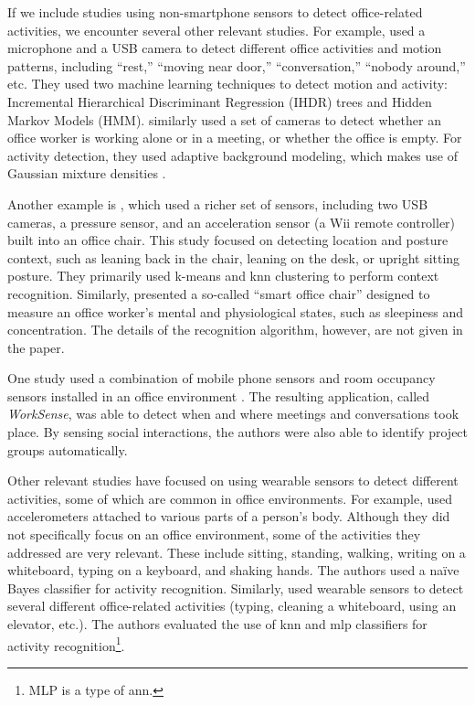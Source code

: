 If we include studies using non-smartphone sensors to detect office-related activities, we encounter several other relevant studies. For example, \cite{huang2004office} %
used a microphone and a USB %
camera to detect different office activities and motion patterns, including ``rest,'' ``moving near door,'' ``conversation,'' ``nobody around,'' etc. They used two machine learning techniques to detect motion and activity: Incremental Hierarchical Discriminant Regression (IHDR) trees and Hidden Markov Models (HMM). \cite{danninger2008context} similarly used a set of cameras to detect whether an office worker is working alone or in a meeting, or whether the office is empty. For activity detection, they used adaptive background modeling, which makes use of Gaussian mixture densities \cite{stauffer1999adaptive}.

Another example is \cite{manabe2010perceptual}, which used a richer set of sensors, including two USB cameras, a pressure sensor, and an acceleration sensor (a Wii remote controller) built into an office chair. This study focused on detecting location and posture context, such as leaning back in the chair, leaning on the desk, or upright sitting posture. They primarily used k-means and \gls{knn} %
clustering to perform context recognition. Similarly, \cite{kiyokawa2012owens} %
presented a so-called ``smart office chair'' designed to measure an office worker's mental and physiological states, such as sleepiness and concentration. The details of the recognition algorithm, however, are not given in the paper.

One study used a combination of mobile phone sensors and room occupancy sensors installed in an office environment \cite{rachuri2014smartphone}. The resulting application, called \emph{WorkSense}, was able to detect when and where meetings and conversations took place. By sensing social interactions, the authors were also able to identify project groups automatically.

Other relevant studies have focused on using wearable sensors to detect different activities, some of which are common in office environments. For example, \cite{kern2003multi} %
used accelerometers attached to various parts of a person's body. Although they did not specifically focus on an office environment, some of the activities they addressed are very relevant. These include sitting, standing, walking, writing on a whiteboard, typing on a keyboard, and shaking hands. The authors used a na\"{i}ve Bayes classifier for activity recognition. Similarly, \cite{pirttikangas2006feature} used wearable sensors to detect several different office-related activities (typing, cleaning a whiteboard, using an elevator, etc.). The authors evaluated the use of \gls{knn} and \gls{mlp} classifiers for activity recognition\footnote{MLP is a type of \gls{ann}.}.


